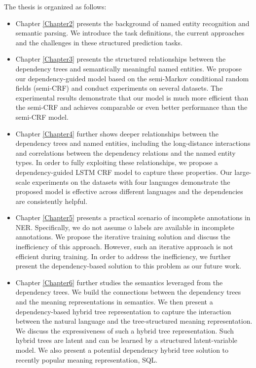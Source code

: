 The thesis is organized as follows:
\begin{itemize}
	\item Chapter \ref{Chapter2} presents the background of named entity recognition and semantic parsing. 
	We introduce the task definitions, the current approaches and the challenges in these structured prediction tasks.
	
	\item Chapter \ref{Chapter3} presents the structured relationships between the dependency trees and semantically meaningful named entities. 
	We propose our dependency-guided model based on the semi-Markov conditional random fields (semi-CRF) and conduct experiments on several datasets.
	The experimental results demonstrate that our model is much more efficient than the semi-CRF and achieves comparable or even better performance than the semi-CRF model.
	
	\item Chapter \ref{Chapter4} further shows deeper relationships between the dependency trees and named entities, including the long-distance interactions and correlations between the dependency relations and the named entity types. 
	In order to fully exploiting these relationships, we  propose a dependency-guided LSTM CRF model to capture these properties. 
	Our large-scale experiments on the datasets with four languages demonstrate the proposed model is effective across different languages and the dependencies are consistently helpful.
	
	
	\item Chapter \ref{Chapter5} presents a practical scenario of incomplete annotations in NER.
	Specifically, we do not assume \textsc{o} labels are available in incomplete annotations. 
	We propose the iterative training solution and discuss the inefficiency of this approach. 
	However, such an iterative approach is not efficient during training. 
	In order to address the inefficiency, we further present the dependency-based solution to this problem as our future work. 
	
	\item Chapter \ref{Chapter6} further studies the semantics leveraged from the dependency trees. 
	We build the connections between the dependency trees and the meaning representations in semantics. 
	We then present a dependency-based hybrid tree representation to capture the interaction between the natural language and the tree-structured meaning representation. 
	We discuss the expressiveness of such a  hybrid tree representation.  
	Such hybrid trees are latent and can be learned by a structured latent-variable model. 
	We also present a potential dependency hybrid tree solution to recently popular meaning representation, SQL.
	

\end{itemize}
